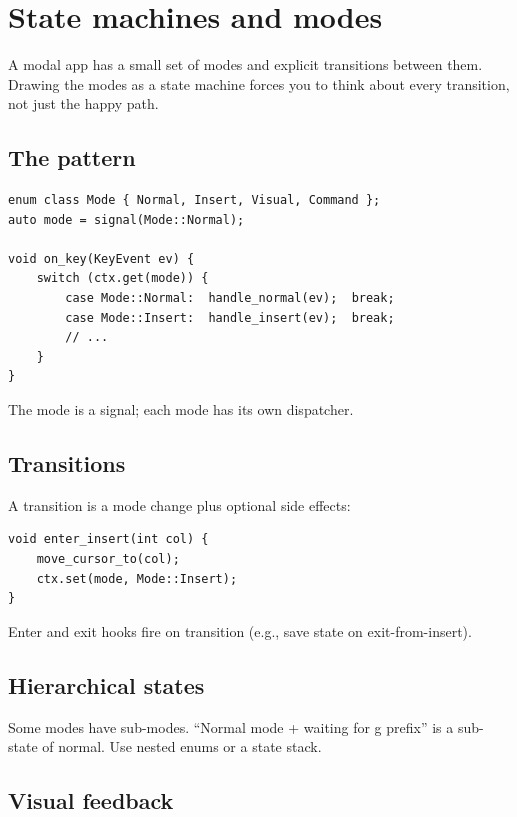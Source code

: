 \chapter{State machines and modes}
\label{ch:fsm}

\begin{aside}
A modal app has a small set of modes and explicit transitions
between them. Drawing the modes as a state machine forces you
to think about every transition, not just the happy path.
\end{aside}

\section{The pattern}

\begin{lstlisting}
enum class Mode { Normal, Insert, Visual, Command };
auto mode = signal(Mode::Normal);

void on_key(KeyEvent ev) {
    switch (ctx.get(mode)) {
        case Mode::Normal:  handle_normal(ev);  break;
        case Mode::Insert:  handle_insert(ev);  break;
        // ...
    }
}
\end{lstlisting}

The mode is a signal; each mode has its own dispatcher.

\section{Transitions}

A transition is a mode change plus optional side effects:

\begin{lstlisting}
void enter_insert(int col) {
    move_cursor_to(col);
    ctx.set(mode, Mode::Insert);
}
\end{lstlisting}

Enter and exit hooks fire on transition (e.g., save state
on exit-from-insert).

\section{Hierarchical states}

Some modes have sub-modes. ``Normal mode + waiting for g
prefix'' is a sub-state of normal. Use nested enums or a
state stack.

\section{Visual feedback}

